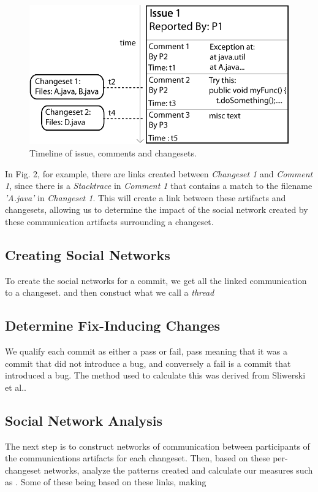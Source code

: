 \documentclass[conference]{IEEEtran}
\begin{document}
\begin{figure}[hb!]
\centering
\includegraphics[width=1.0\columnwidth]{Items}
\caption{Timeline of issue, comments and changesets.\label{fig:items}}
\end{figure}

In Fig. 2, for example, there are links created between \emph{Changeset 1} and \emph{Comment 1}, since there is a \emph{Stacktrace} in \emph{Comment 1} that contains a match to the filename \emph{'A.java'} in \emph{Changeset 1}.  This will create a link between these artifacts and changesets, allowing us to determine the impact of the social network created by these communication artifacts surrounding a changeset.

\subsection{Creating Social Networks} 
To create the social networks for a commit, we get all the linked communication to a changeset.   and then constuct what we call a \emph{thread}

\subsection{Determine Fix-Inducing Changes}
We qualify each commit as either a pass or fail, pass meaning that it was a commit that did not introduce a bug, and conversely a fail is a commit that introduced a bug.  The method used to calculate this was derived from Sliwerski et al.\cite{Sliwerski:2005:CIF:1083142.1083147}. 

\subsection{Social Network Analysis}
The next step is to construct networks of communication between participants of the communications artifacts for each changeset.  Then, based on these per-changeset networks, analyze the patterns created and calculate our measures such as .  Some of these being based on these links, making 
\end{document}
